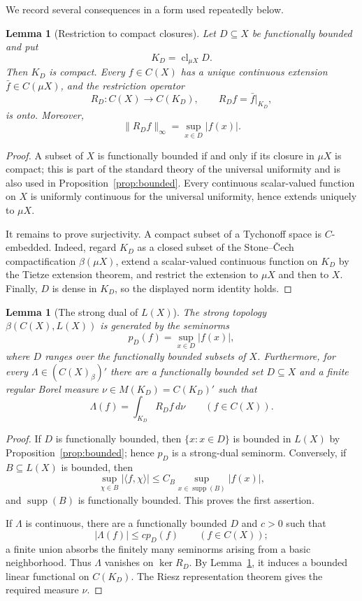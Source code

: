 \documentclass[11pt]{article}
\newtheorem{lemma}[theorem]{Lemma}
\newcommand{\supp}{\operatorname{supp}}
\newcommand{\cl}{\operatorname{cl}}
\begin{document}
We record several consequences in a form used repeatedly below.

\begin{lemma}[Restriction to compact closures]\label{lem:restriction}
Let $D\subseteq X$ be functionally bounded and put
\[
  K_D=\cl_{\mu X}D.
\]
Then $K_D$ is compact.  Every $f\in C(X)$ has a unique continuous extension
$\bar f\in C(\mu X)$, and the restriction operator
\[
  R_D:C(X)\longrightarrow C(K_D),
  \qquad R_Df=\bar f|_{K_D},
\]
is onto.  Moreover,
\[
  \|R_Df\|_\infty=\sup_{x\in D}|f(x)|.
\]
\end{lemma}

\begin{proof}
A subset of $X$ is functionally bounded if and only if its closure in $\mu X$
is compact; this is part of the standard theory of the universal uniformity and
is also used in Proposition~\ref{prop:bounded}.  Every continuous scalar-valued
function on $X$ is uniformly continuous for the universal uniformity, hence
extends uniquely to $\mu X$.

It remains to prove surjectivity.  A compact subset of a Tychonoff space is
$C$-embedded.  Indeed, regard $K_D$ as a closed subset of the Stone--\v Cech
compactification $\beta(\mu X)$, extend a scalar-valued continuous function on
$K_D$ by the Tietze extension theorem, and restrict the extension to $\mu X$
and then to $X$.  Finally, $D$ is dense in $K_D$, so the displayed norm identity
holds.
\end{proof}

\begin{lemma}[The strong dual of $L(X)$]\label{lem:strongdual}
The strong topology $\beta(C(X),L(X))$ is generated by the seminorms
\[
  p_D(f)=\sup_{x\in D}|f(x)|,
\]
where $D$ ranges over the functionally bounded subsets of $X$.
Furthermore, for every
\(
  \Lambda\in(C(X)_\beta)'
\)
there are a functionally bounded set $D\subseteq X$ and a finite regular Borel
measure $\nu\in M(K_D)=C(K_D)'$ such that
\[
  \Lambda(f)=\int_{K_D}R_Df\,d\nu
  \qquad(f\in C(X)).
\]
\end{lemma}

\begin{proof}
If $D$ is functionally bounded, then $\{x:x\in D\}$ is bounded in $L(X)$ by
Proposition~\ref{prop:bounded}; hence $p_D$ is a strong-dual seminorm.
Conversely, if $B\subseteq L(X)$ is bounded, then
\[
  \sup_{\chi\in B}|\langle f,\chi\rangle|
  \leq C_B\sup_{x\in\supp(B)}|f(x)|,
\]
and $\supp(B)$ is functionally bounded.  This proves the first assertion.

If $\Lambda$ is continuous, there are a functionally bounded $D$ and $c>0$
such that
\[
  |\Lambda(f)|\leq c p_D(f)
  \qquad(f\in C(X));
\]
a finite union absorbs the finitely many seminorms arising from a basic
neighborhood.  Thus $\Lambda$ vanishes on $\ker R_D$.  By
Lemma~\ref{lem:restriction}, it induces a bounded linear functional on
$C(K_D)$.  The Riesz representation theorem gives the required measure $\nu$.
\end{proof}
\end{document}
